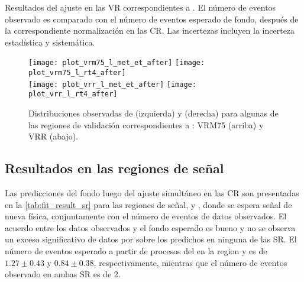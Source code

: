 \begin{table}[!htb]

  \caption{Resultados del ajuste en las VR correspondientes a {\SRH}.
    El número de eventos observado es comparado con el número de eventos
    esperado de fondo, después de la correspondiente normalización en las CR.
    Las incertezas incluyen la incerteza estadística y sistemática.}
  \label{tab:fit_result_vrh}

  

  \bigskip

  

\end{table}


\begin{figure}[!htb]
  \centering

  \texttt{[image: plot\_vrm75\_l\_met\_et\_after]}
  \texttt{[image: plot\_vrm75\_l\_rt4\_after]} \\

  \texttt{[image: plot\_vrr\_l\_met\_et\_after]}
  \texttt{[image: plot\_vrr\_l\_rt4\_after]} \\

  \caption{Distribuciones observadas de {\met} (izquierda) y {\rt} (derecha) para algunas de las regiones de validación
    correspondientes a {\SRL}: VRM75 (arriba) y VRR (abajo). }
  \label{fig:bkgfit_vr}

\end{figure}



\subsection{Resultados en las regiones de señal}

Las predicciones del fondo luego del ajuste simultáneo en las CR son presentadas
en la \cref{tab:fit_result_sr} para las regiones de señal, {\SRL} y {\SRH}, donde
se espera señal de nueva física,
conjuntamente con el número de eventos de datos observados. El acuerdo entre los
datos observados y el fondo esperado es bueno y no se observa un exceso
significativo de datos por sobre los predichos en ninguna de las SR.
El número de eventos esperado a partir de procesos del {\SM}  en la region {\SRL} y
{\SRH} es de $1.27\pm0.43$ y $0.84\pm0.38$, respectivamente, mientras que el
número de eventos observado en ambas SR es de 2.

